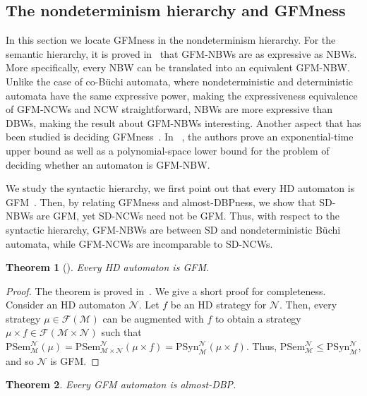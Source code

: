 \documentclass[10pt,a4paper]{amsart}
\newtheorem{thm}{Theorem}[section]
\newtheorem{thmC}[thm]{Theorem}
\theoremstyle{definition}
\numberwithin{equation}{section}
\newcommand{\M}{{\mathcal M}}
\newcommand{\F}{{\mathcal F}}
\newcommand{\N}{{\mathcal N}}
\begin{document}
\subsection{The nondeterminism hierarchy and GFMness}

In this section we locate GFMness in the nondeterminism hierarchy. For the semantic hierarchy, it is proved in~\cite{HPSSTWW20} that GFM-NBWs are as expressive as NBWs. More specifically, every NBW can be translated into an equivalent GFM-NBW. Unlike the case of co-B\"uchi automata, where nondeterministic and deterministic automata have the same expressive power, making the expressiveness equivalence of GFM-NCWs and NCW straightforward,  NBWs are more expressive than DBWs, making the result about GFM-NBWs interesting. Another aspect that has been studied is deciding GFMness~\cite{STZ22}. In ~\cite{STZ22},  the authors prove an exponential-time upper bound as well as  a polynomial-space lower  bound for the problem of deciding whether an automaton is GFM-NBW. 

We study the syntactic hierarchy, we first point out that every HD automaton is GFM~\cite{KMBK14}. 
Then, by relating GFMness and almost-DBPness, we show that SD-NBWs are GFM, yet SD-NCWs need not be GFM. Thus, with respect to the syntactic hierarchy, GFM-NBWs are between SD and nondeterministic B\"uchi automata, while GFM-NCWs are incomparable to SD-NCWs.
 
\begin{thmC}[\cite{KMBK14}]
\label{hd implies gfm}
	Every HD automaton is GFM.
\end{thmC}

\begin{proof}
	The theorem is proved in~\cite{KMBK14}. We give a short proof for completeness.
Consider an HD automaton $\N$. Let $f$ be an HD strategy for $\N$. Then, every strategy $\mu\in\F(\M)$ can be augmented with $f$ to obtain a strategy $\mu\times f\in \F(\M\times \N)$ such that $\mathrm{PSem}^\N_{\M}(\mu)=\mathrm{PSem}^\N_{\M\times \N}(\mu\times f)=\mathrm{PSyn}^\N_\M(\mu\times f)$. Thus, $\mathrm{PSem}^\N_\M\leq \mathrm{PSyn}^\N_\M$, and so $\N$ is GFM.
\end{proof}



\begin{thm}
	\label{gfm-nbw almost}
	Every GFM automaton is almost-DBP.
\end{thm}
\end{document}
